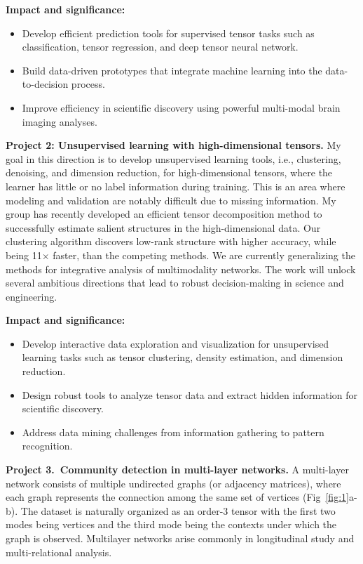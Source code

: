 \documentclass[11pt]{article}
\DeclareRobustCommand{\mybox}[2][gray!20]{%
\begin{tcolorbox}[   %
        breakable,
        left=0pt,
        right=0pt,
        top=0pt,
        bottom=0pt,
        colback=#1,
        colframe=#1,
        width=\dimexpr\textwidth\relax, 
        enlarge left by=0mm,
        boxsep=5pt,
        arc=0pt,outer arc=0pt,
        ]
        #2
\end{tcolorbox}
}
\theoremstyle{plain}
\theoremstyle{definition}
\begin{document}
\mybox[gray!20]{{\bf Impact and significance:} 
\begin{itemize}[leftmargin=*]
\item Develop efficient prediction tools for supervised tensor tasks such as classification, tensor regression, and deep tensor neural network.
\item  Build data-driven prototypes that integrate machine learning into the data-to-decision process. 
\item  Improve efficiency in scientific discovery using powerful multi-modal brain imaging analyses.
\end{itemize}
}

{\bf Project 2: Unsupervised learning with high-dimensional tensors.} My goal in this direction is to develop unsupervised learning tools, i.e., clustering, denoising, and dimension reduction, for high-dimensional tensors, where the learner has little or no label information during training. This is an area where modeling and validation are notably difficult due to missing information. My group has recently developed an efficient tensor decomposition method to successfully estimate salient structures in the high-dimensional data. Our clustering algorithm discovers low-rank structure with higher accuracy, while being 11$\times$ faster, than the competing methods. We are currently generalizing the methods for integrative analysis of multimodality networks. The work will unlock several ambitious directions that lead to robust decision-making in science and engineering.
\mybox[gray!20]{{\bf Impact and significance:} 
\begin{itemize}[leftmargin=*]
\item Develop interactive data exploration and visualization for unsupervised learning tasks such as tensor clustering, density estimation, and dimension reduction.
\item Design robust tools to analyze tensor data and extract hidden information for scientific discovery. 
\item Address data mining challenges from information gathering to pattern recognition.
\end{itemize}
}


{\bf Project 3.\  Community detection in multi-layer networks.}
A multi-layer network consists of multiple undirected graphs (or adjacency matrices), where each graph represents the connection among the same set of vertices (Fig~\ref{fig:1}a-b). The dataset is naturally organized as an order-3 tensor with the first two modes being vertices and the third mode being the contexts under which the graph is observed. Multilayer networks arise commonly in longitudinal study and multi-relational analysis. 
\end{document}
